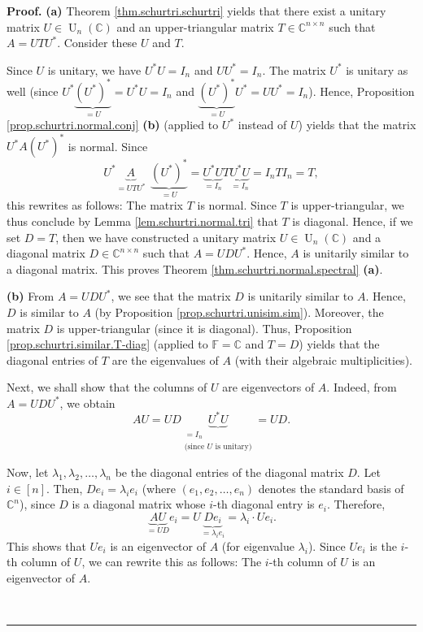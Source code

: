 \documentclass[numbers=enddot,12pt,final,onecolumn,notitlepage]{scrartcl}%
\numberwithin{exer}{subsection}
\theoremstyle{definition}
\newenvironment{proof}[1][Proof]{\noindent\textbf{#1.} }{\ \rule{0.5em}{0.5em}}
\begin{document}
\begin{proof}
\textbf{(a)} Theorem \ref{thm.schurtri.schurtri} yields that there exist a
unitary matrix $U\in\operatorname*{U}\nolimits_{n}\left(  \mathbb{C}\right)  $
and an upper-triangular matrix $T\in\mathbb{C}^{n\times n}$ such that
$A=UTU^{\ast}$. Consider these $U$ and $T$.

Since $U$ is unitary, we have $U^{\ast}U=I_{n}$ and $UU^{\ast}=I_{n}$. The
matrix $U^{\ast}$ is unitary as well (since $U^{\ast}\underbrace{\left(
U^{\ast}\right)  ^{\ast}}_{=U}=U^{\ast}U=I_{n}$ and $\underbrace{\left(
U^{\ast}\right)  ^{\ast}}_{=U}U^{\ast}=UU^{\ast}=I_{n}$). Hence, Proposition
\ref{prop.schurtri.normal.conj} \textbf{(b)} (applied to $U^{\ast}$ instead of
$U$) yields that the matrix $U^{\ast}A\left(  U^{\ast}\right)  ^{\ast}$ is
normal. Since%
\[
U^{\ast}\underbrace{A}_{=UTU^{\ast}}\ \ \underbrace{\left(  U^{\ast}\right)
^{\ast}}_{=U}=\underbrace{U^{\ast}U}_{=I_{n}}T\underbrace{U^{\ast}U}_{=I_{n}%
}=I_{n}TI_{n}=T,
\]
this rewrites as follows: The matrix $T$ is normal. Since $T$ is
upper-triangular, we thus conclude by Lemma \ref{lem.schurtri.normal.tri} that
$T$ is diagonal. Hence, if we set $D=T$, then we have constructed a unitary
matrix $U\in\operatorname*{U}\nolimits_{n}\left(  \mathbb{C}\right)  $ and a
diagonal matrix $D\in\mathbb{C}^{n\times n}$ such that $A=UDU^{\ast}$. Hence,
$A$ is unitarily similar to a diagonal matrix. This proves Theorem
\ref{thm.schurtri.normal.spectral} \textbf{(a)}. \medskip

\textbf{(b)} From $A=UDU^{\ast}$, we see that the matrix $D$ is unitarily
similar to $A$. Hence, $D$ is similar to $A$ (by Proposition
\ref{prop.schurtri.unisim.sim}). Moreover, the matrix $D$ is upper-triangular
(since it is diagonal). Thus, Proposition \ref{prop.schurtri.similar.T-diag}
(applied to $\mathbb{F}=\mathbb{C}$ and $T=D$) yields that the diagonal
entries of $T$ are the eigenvalues of $A$ (with their algebraic multiplicities).

Next, we shall show that the columns of $U$ are eigenvectors of $A$. Indeed,
from $A=UDU^{\ast}$, we obtain
\[
AU=UD\underbrace{U^{\ast}U}_{\substack{=I_{n}\\\text{(since }U\text{ is
unitary)}}}=UD.
\]


Now, let $\lambda_{1},\lambda_{2},\ldots,\lambda_{n}$ be the diagonal entries
of the diagonal matrix $D$. Let $i\in\left[  n\right]  $. Then, $De_{i}%
=\lambda_{i}e_{i}$ (where $\left(  e_{1},e_{2},\ldots,e_{n}\right)  $ denotes
the standard basis of $\mathbb{C}^{n}$), since $D$ is a diagonal matrix whose
$i$-th diagonal entry is $e_{i}$. Therefore,%
\[
\underbrace{AU}_{=UD}e_{i}=U\underbrace{De_{i}}_{=\lambda_{i}e_{i}}%
=\lambda_{i}\cdot Ue_{i}.
\]
This shows that $Ue_{i}$ is an eigenvector of $A$ (for eigenvalue $\lambda
_{i}$). Since $Ue_{i}$ is the $i$-th column of $U$, we can rewrite this as
follows: The $i$-th column of $U$ is an eigenvector of $A$.


\end{proof}
\end{document}
